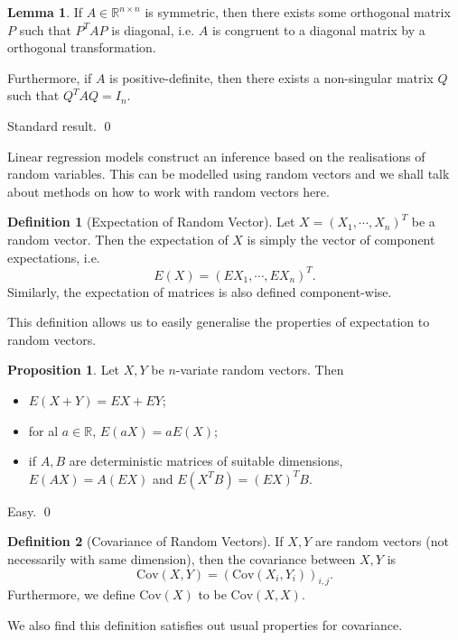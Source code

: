 \documentclass[
]{article}
\theoremstyle{definition}
\newtheorem{prop}{Proposition}
\theoremstyle{definition}
\newtheorem{definition}{Definition}[section]
\newtheorem{lemma}{Lemma}[section]
\begin{document}
\begin{lemma}
  If \(A \in \mathbb{R}^{n \times n}\) is symmetric, then there exists some orthogonal 
  matrix \(P\) such that \(P^T A P\) is diagonal, i.e. \(A\) is congruent to a 
  diagonal matrix by a orthogonal transformation.

  Furthermore, if \(A\) is positive-definite, then there exists a non-singular 
  matrix \(Q\) such that \(Q^T A Q = I_n\).
\end{lemma}
\proof

Standard result. \qed

Linear regression models construct an inference based on the
realisations of random variables. This can be modelled using random
vectors and we shall talk about methods on how to work with random
vectors here.

\begin{definition}[Expectation of Random Vector]
  Let \(X = (X_1, \cdots, X_n)^T\) be a random vector. Then the expectation of 
  \(X\) is simply the vector of component expectations, i.e. 
  \[E(X) = (EX_1, \cdots, EX_n)^T.\] 
  Similarly, the expectation of matrices is also defined component-wise.
\end{definition}

This definition allows us to easily generalise the properties of
expectation to random vectors.

\begin{prop}
  Let \(X, Y\) be \(n\)-variate random vectors. Then 
  \begin{itemize}
    \item \(E(X + Y) = EX + EY\);
    \item for al \(a \in \mathbb{R}\), \(E(aX) = aE(X)\);
    \item if \(A, B\) are deterministic matrices of suitable dimensions, 
      \(E(AX) = A(EX)\) and \(E(X^T B) = (EX)^TB\).
  \end{itemize}
\end{prop}
\proof

Easy. \qed

\begin{definition}[Covariance of Random Vectors]
  If \(X, Y\) are random vectors (not necessarily with same dimension), then 
  the covariance between \(X, Y\) is 
  \[\text{Cov}(X, Y) = (\text{Cov}(X_i, Y_i))_{i, j}.\]
  Furthermore, we define \(\text{Cov}(X)\) to be \(\text{Cov}(X, X)\).
\end{definition}

We also find this definition satisfies out usual properties for
covariance.
\end{document}
